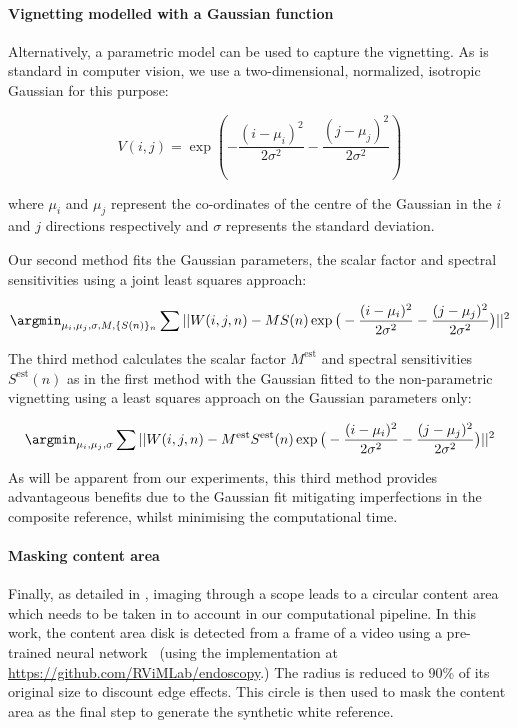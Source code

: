 \paragraph{Vignetting modelled with a Gaussian function}
Alternatively, a parametric model can be used to capture the vignetting.
As is standard in computer vision, we use a two-dimensional, normalized, isotropic Gaussian for this purpose:
\begin{linenomath*}
\begin{equation}
	V(i,j) = \exp\left(-\frac{(i-\mu_i)^2}{2\sigma^2} - \frac{(j-\mu_j)^2}{2\sigma^2} \right)
\label{eq:2DGauss}
\end{equation}
\end{linenomath*}
%
where $\mu_i$ and $\mu_j$ represent the co-ordinates of the centre of the Gaussian in the $i$ and $j$ directions respectively and $\sigma$ represents the standard deviation. 
%

Our second method fits the Gaussian parameters, the scalar factor and spectral sensitivities using a joint least squares approach:
%
\begin{linenomath*}
\begin{equation}
	\argmin_{\mu_i,\mu_j,\sigma, M, \{S(n)\}_{n}} \sum || W(i,j,n) - MS(n) \exp\big( -\frac{(i-\mu_i)^2}{2\sigma^2} - \frac{(j-\mu_j)^2}{2\sigma^2}\big) ||^2
\end{equation}
\end{linenomath*}

The third method calculates the scalar factor $M^{\textrm{est}}$ and spectral sensitivities $S^{\textrm{est}}(n)$ as in the first method with the Gaussian fitted to the non-parametric vignetting using a 
%
least squares approach on the Gaussian parameters only:
\begin{linenomath*}
\begin{equation}
	\argmin_{\mu_i,\mu_j,\sigma} \sum || W(i,j,n) - M^{\textrm{est}}S^{\textrm{est}}(n) \exp\big( -\frac{(i-\mu_i)^2}{2\sigma^2} - \frac{(j-\mu_j)^2}{2\sigma^2}\big) ||^2
\end{equation}
\end{linenomath*}
%
%
As will be apparent from our experiments, this third method provides advantageous benefits due to the Gaussian fit mitigating imperfections in the composite reference, whilst minimising the computational time.

%
%

\paragraph{Masking content area}
Finally, as detailed in \cite{Munzer2013,Huber2022}, imaging through a scope leads to a circular content area which needs to be taken in to account in our computational pipeline.
In this work, the content area disk
%
is detected from a frame of a video using a pre-trained neural network~\cite{Huber2022} (using the implementation at \url{https://github.com/RViMLab/endoscopy}.)
The radius is reduced to 90\% of its original size to discount edge effects. This circle is then used to mask the content area as the final step to generate the synthetic white reference.

